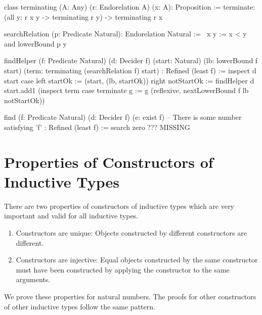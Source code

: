 \begin{alba}
    class terminating (A: Any) (r: Endorelation A) (x: A): Proposition :=
        terminate: (all y: r x y -> terminating r y) -> terminating r x
\end{alba}


\begin{alba}
    searchRelation (p: Predicate Natural): Endorelation Natural :=
        \ x y := x < y and lowerBound p y
\end{alba}


\begin{alba}
    findHelper
        (f: Predicate Natural)
        (d: Decider f)
        (start: Natural)
        (lb: lowerBound f start)
        (term: terminating (searchRelation f) start)
        : Refined (least f)
    :=
        inspect d start case
            left startOk :=
                (start, (lb, startOk))
            right notStartOk :=
                findHelper
                    d
                    start.add1
                    (inspect term case
                        terminate g :=
                            g (reflexive, nextLowerBound f lb notStartOk))


    find
        (f: Predicate Natural)
        (d: Decider f)
        (e: exist f)        -- There is some number satisfying 'f'
        : Refined (least f)
    :=
        search zero ???
        MISSING
\end{alba}



\vskip 5mm
\section{Properties of Constructors of Inductive Types}

There are two properties of constructors of inductive types which are very
important and valid for all inductive types.

\begin{enumerate}

\item Constructors are unique: Objects constructed by
different constructors are different.

\item Constructors are injective: Equal objects constructed by the same
constructor must have been constructed by applying the constructor to the same
arguments.

\end{enumerate}

We prove these properties for natural numbers. The proofs for other constructors
of other inductive types follow the same pattern.




